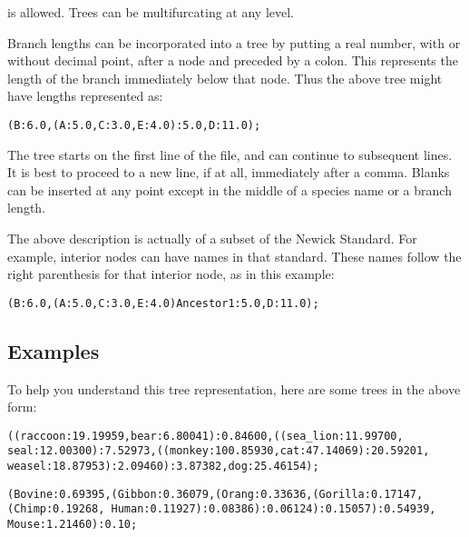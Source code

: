 \bigskip

is allowed. Trees can be multifurcating at any level.

\bigskip

Branch lengths can be incorporated into a tree by putting a real number,
with or without decimal point, after a node and preceded by a colon.
This represents the length of the branch immediately below that node.
Thus the above tree might have lengths represented as:

\bigskip

\texttt{(B:6.0,(A:5.0,C:3.0,E:4.0):5.0,D:11.0);}

\bigskip

The tree starts on the first line of the file, and can continue to
subsequent lines. It is best to proceed to a new line, if at all,
immediately after a comma. Blanks can be inserted at any point except in
the middle of a species name or a branch length.

\bigskip

The above description is actually of a subset of the Newick Standard.
For example, interior nodes can have names in that standard. These names
follow the right parenthesis for that interior node, as in this example:

\bigskip

\texttt{(B:6.0,(A:5.0,C:3.0,E:4.0)Ancestor1:5.0,D:11.0);}

\hypertarget{examples}{%
\subsection*{Examples}\label{examples}}

To help you understand this tree representation, here are some trees in
the above form:

\bigskip

\texttt{((raccoon:19.19959,bear:6.80041):0.84600,((sea\_lion:11.99700,\ \\ seal:12.00300):7.52973,((monkey:100.85930,cat:47.14069):20.59201,\ \\ weasel:18.87953):2.09460):3.87382,dog:25.46154);}
 
\bigskip

\noindent \texttt{(Bovine:0.69395,(Gibbon:0.36079,(Orang:0.33636,(Gorilla:0.17147,\\ (Chimp:0.19268,\ Human:0.11927):0.08386):0.06124):0.15057):0.54939,\\ Mouse:1.21460):0.10;}

\bigskip

